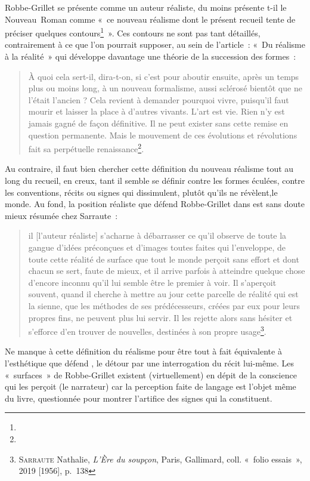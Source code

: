 \documentclass[12pt, a4paper]{article}
\begin{document}
Robbe-Grillet se présente comme un auteur réaliste, du moins présente t-il le Nouveau~Roman comme «~ce nouveau réalisme dont le présent recueil tente de préciser quelques contours\footnote{}~». Ces contours ne sont pas tant détaillés, contrairement à ce que l'on pourrait supposer, au sein de l'article~: «~Du réalisme à la réalité~» qui développe davantage une théorie de la succession des formes~:
\begin{quote}
    À quoi cela sert-il, dira-t-on, si c’est pour aboutir ensuite, après un temps plus ou moins long, à un nouveau formalisme, aussi sclérosé bientôt que ne l’était l’ancien ? Cela revient à demander pourquoi vivre, puisqu’il faut mourir et laisser la place à d’autres vivants. L’art est vie. Rien n’y est jamais gagné de façon définitive. Il ne peut exister sans cette remise en question permanente. Mais le mouvement de ces évolutions et révolutions fait sa perpétuelle renaissance\footnote{}.
\end{quote}
Au contraire, il faut bien chercher cette définition du nouveau réalisme tout au long du recueil, en creux, tant il semble se définir contre les formes éculées, contre les conventions, récits ou signes qui dissimulent, plutôt qu'ils ne révèlent,le monde. Au fond, la position réaliste que défend Robbe-Grillet dans \punr{} est sans doute mieux résumée chez Sarraute~: 
\begin{quote}
    il [l'auteur réaliste] s'acharne à débarrasser ce qu'il observe de toute la gangue d'idées préconçues et d'images toutes faites qui l'enveloppe, de toute cette réalité de surface que tout le monde perçoit sans effort et dont chacun se sert, faute de mieux, et il arrive parfois à atteindre quelque chose d'encore inconnu qu'il lui semble être le premier à voir. Il s'aperçoit souvent, quand il cherche à mettre au jour cette parcelle de réalité qui est la sienne, que les méthodes de ses prédécesseurs, créées par eux pour leurs propres fins, ne peuvent plus lui servir. Il les rejette alors sans hésiter et s'efforce d'en trouver de nouvelles, destinées à son propre usage\footnote{\textsc{Sarraute} Nathalie, \textit{L'Ère du soupçon}, Paris, Gallimard, coll. «~folio essais~», 2019 [1956], p.~138}.
\end{quote}
Ne manque à cette définition du réalisme pour être tout à fait équivalente à l'esthétique que défend \punr, le détour par une interrogation du récit lui-même. Les «~surfaces~» de Robbe-Grillet existent (virtuellement) en dépit de la conscience qui les perçoit (le narrateur) car la perception faite de langage est l'objet même du livre, questionnée pour montrer l'artifice des signes qui la constituent.
\end{document}
